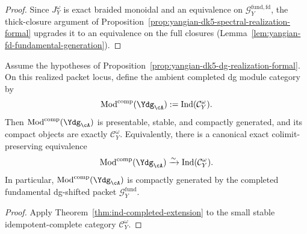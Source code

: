 \begin{proof}
Since \(J_Y^\omega\) is exact braided monoidal and an equivalence on
\(\mathcal{G}^{\mathrm{fund,fd}}_{Y}\), the thick-closure argument of
Proposition~\ref{prop:yangian-dk5-spectral-realization-formal} upgrades
it to an equivalence on the full closures
(Lemma~\ref{lem:yangian-fd-fundamental-generation}).
\end{proof}

\begin{corollary}
\label{cor:yangian-dk5-dg-packet-ind}
Assume the hypotheses of
Proposition~\ref{prop:yangian-dk5-dg-realization-formal}.  On this
realized packet locus, define the ambient completed dg module category
by
\[
\operatorname{Mod}^{\mathrm{comp}}(\Ydg_{\cA})
:=
\operatorname{Ind}(\mathcal{C}_Y^\omega).
\]
Then \(\operatorname{Mod}^{\mathrm{comp}}(\Ydg_{\cA})\) is presentable,
stable, and compactly generated, and its compact objects are exactly
\(\mathcal{C}_Y^\omega\).  Equivalently, there is a canonical exact
colimit-preserving equivalence
\[
\operatorname{Mod}^{\mathrm{comp}}(\Ydg_{\cA})
\xrightarrow{\sim}
\operatorname{Ind}(\mathcal{C}_Y^\omega).
\]
In particular, \(\operatorname{Mod}^{\mathrm{comp}}(\Ydg_{\cA})\) is
compactly generated by the completed fundamental dg-shifted packet
\(\mathcal{G}^{\mathrm{fund}}_{Y}\).

\end{corollary}

\begin{proof}
Apply Theorem~\ref{thm:ind-completed-extension} to the small stable
idempotent-complete category \(\mathcal{C}_Y^\omega\).
\end{proof}

